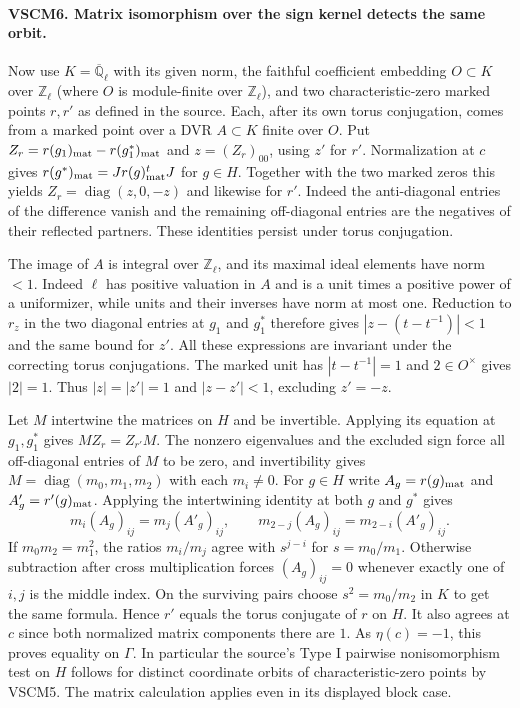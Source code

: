 \paragraph{VSCM6. Matrix isomorphism over the sign kernel detects the same orbit.}
\label{claim:VSCM6}
Now use $K=\overline{\mathbb Q}_\ell$ with its given norm, the
faithful coefficient embedding $O\subset K$ over $\mathbb Z_\ell$
(where $O$ is module-finite over $\mathbb Z_\ell$), and two
characteristic-zero marked points $r,r'$ as defined in the source. Each,
after its own torus conjugation, comes from a marked point over a DVR
$A\subset K$ finite over $O$. Put $Z_r=r(g_1)_{\rm mat}-r(g_1^*)_{\rm mat}$
and $z=(Z_r)_{00}$, using $z'$ for $r'$. Normalization at $c$
gives $r(g^*)_{\rm mat}=Jr(g)_{\rm mat}^tJ$ for $g\in H$.
Together with the two marked zeros this yields
$Z_r=\operatorname{diag}(z,0,-z)$ and likewise for $r'$.
Indeed the anti-diagonal entries of the difference vanish and the
remaining off-diagonal entries are the negatives of their reflected
partners. These identities persist under torus conjugation.

The image of $A$ is integral over $\mathbb Z_\ell$, and its maximal
ideal elements have norm $<1$. Indeed $\ell$ has positive valuation in $A$
and is a unit times a positive power of a uniformizer, while units
and their inverses have norm at most one. Reduction to $r_z$ in the
two diagonal entries at $g_1$ and $g_1^*$ therefore gives
$|z-(t-t^{-1})|<1$ and the same bound for $z'$. All these expressions
are invariant under the correcting torus conjugations. The marked
unit has $|t-t^{-1}|=1$ and $2\in O^\times$ gives $|2|=1$.
Thus $|z|=|z'|=1$ and $|z-z'|<1$, excluding $z'=-z$.

Let $M$ intertwine the matrices on $H$ and be invertible.
Applying its equation at $g_1,g_1^*$ gives $MZ_r=Z_{r'}M$.
The nonzero eigenvalues and the excluded sign force all off-diagonal
entries of $M$ to be zero, and invertibility gives
$M=\operatorname{diag}(m_0,m_1,m_2)$ with each $m_i\ne0$.
For $g\in H$ write $A_g=r(g)_{\rm mat}$ and $A'_g=r'(g)_{\rm mat}$.
Applying the intertwining identity at both $g$ and $g^*$ gives
\[
 m_i(A_g)_{ij}=m_j(A'_g)_{ij},\qquad
 m_{2-j}(A_g)_{ij}=m_{2-i}(A'_g)_{ij}.
\]
If $m_0m_2=m_1^2$, the ratios $m_i/m_j$ agree with
$s^{j-i}$ for $s=m_0/m_1$. Otherwise subtraction after cross
multiplication forces $(A_g)_{ij}=0$ whenever exactly one of $i,j$
is the middle index. On the surviving pairs choose
$s^2=m_0/m_2$ in $K$ to get the same formula.
Hence $r'$ equals the torus conjugate of $r$ on $H$. It also agrees
at $c$ since both normalized matrix components there are $1$.
As $\eta(c)=-1$, this proves equality on $\Gamma$. In particular
the source's Type I pairwise nonisomorphism test on $H$ follows for
distinct coordinate orbits of characteristic-zero points by VSCM5.
The matrix calculation applies even in its displayed block case.

